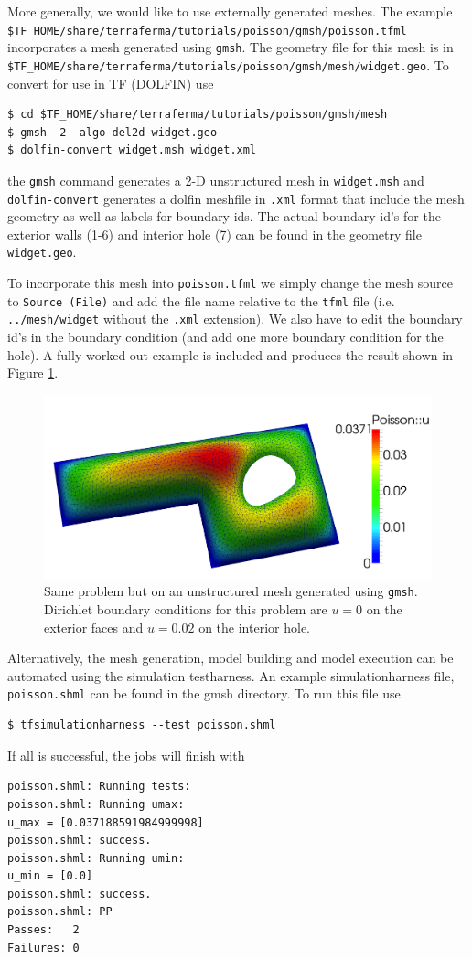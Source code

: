 More generally, we would like to use externally generated meshes.  The
example \texttt{\$TF\_HOME/share/terraferma/tutorials/poisson/gmsh/poisson.tfml}
incorporates a mesh generated using \texttt{gmsh}.  The geometry file
for this mesh is in
\texttt{\$TF\_HOME/share/terraferma/tutorials/poisson/gmsh/mesh/widget.geo}. To convert
for use in TF (DOLFIN) use
\begin{lstlisting}[style=Bash]
$ cd $TF_HOME/share/terraferma/tutorials/poisson/gmsh/mesh
$ gmsh -2 -algo del2d widget.geo
$ dolfin-convert widget.msh widget.xml
\end{lstlisting}
the \texttt{gmsh} command generates a 2-D unstructured mesh in
\texttt{widget.msh} and  \texttt{dolfin-convert} generates a dolfin
meshfile in \texttt{.xml} format  that include the mesh geometry as
well as labels for boundary ids.  The actual boundary id's for the
exterior walls (1-6) and interior hole (7) can be found in the geometry file
\texttt{widget.geo}.

To incorporate this mesh into \texttt{poisson.tfml} we simply change
the mesh source to \texttt{Source (File)} and add the file name
relative to the \texttt{tfml} file (i.e. \texttt{../mesh/widget}
without the \texttt{.xml} extension). We also have to edit the
boundary id's in the boundary condition (and add one more boundary
condition for the hole).  A fully worked out example is included and
produces the result shown in Figure \ref{fig:poisson_gmsh}.
\begin{figure}[h!]
  \centering
\includegraphics[width=.8\textwidth]{figures/poisson_simple_gmsh}
  \caption{\small Same problem but on an unstructured mesh generated using
    \texttt{gmsh}. Dirichlet boundary conditions for this problem are $u=0$ on
    the exterior faces and $u=0.02$ on the interior hole. }
\label{fig:poisson_gmsh}
\end{figure}

Alternatively, the mesh generation, model building and model execution
can be automated using the simulation testharness.  An example
simulationharness file, \texttt{poisson.shml} can be found in the gmsh
directory.  To run this file use
\begin{lstlisting}[style=Bash]
$ tfsimulationharness --test poisson.shml
\end{lstlisting}
If all is successful,  the jobs will finish with
\begin{lstlisting}[style=Bash]
poisson.shml: Running tests:
poisson.shml: Running umax:
u_max = [0.037188591984999998]
poisson.shml: success.
poisson.shml: Running umin:
u_min = [0.0]
poisson.shml: success.
poisson.shml: PP
Passes:   2
Failures: 0
\end{lstlisting}



